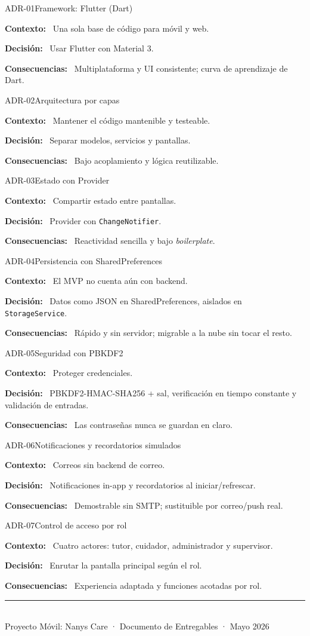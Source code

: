 \documentclass[11pt,a4paper]{article}
\newcommand{\adrcampo}[1]{\par\smallskip\textbf{\color{guindaDark}#1:}\ }
\begin{document}
\begin{adr}{ADR-01}{Framework: Flutter (Dart)}
\adrcampo{Contexto} Una sola base de código para móvil y web.
\adrcampo{Decisión} Usar Flutter con Material 3.
\adrcampo{Consecuencias} Multiplataforma y UI consistente; curva de aprendizaje de Dart.
\end{adr}
\begin{adr}{ADR-02}{Arquitectura por capas}
\adrcampo{Contexto} Mantener el código mantenible y testeable.
\adrcampo{Decisión} Separar modelos, servicios y pantallas.
\adrcampo{Consecuencias} Bajo acoplamiento y lógica reutilizable.
\end{adr}
\begin{adr}{ADR-03}{Estado con Provider}
\adrcampo{Contexto} Compartir estado entre pantallas.
\adrcampo{Decisión} Provider con \texttt{ChangeNotifier}.
\adrcampo{Consecuencias} Reactividad sencilla y bajo \emph{boilerplate}.
\end{adr}
\begin{adr}{ADR-04}{Persistencia con SharedPreferences}
\adrcampo{Contexto} El MVP no cuenta aún con backend.
\adrcampo{Decisión} Datos como JSON en SharedPreferences, aislados en \texttt{StorageService}.
\adrcampo{Consecuencias} Rápido y sin servidor; migrable a la nube sin tocar el resto.
\end{adr}
\begin{adr}{ADR-05}{Seguridad con PBKDF2}
\adrcampo{Contexto} Proteger credenciales.
\adrcampo{Decisión} PBKDF2-HMAC-SHA256 + sal, verificación en tiempo constante y validación de entradas.
\adrcampo{Consecuencias} Las contraseñas nunca se guardan en claro.
\end{adr}
\begin{adr}{ADR-06}{Notificaciones y recordatorios simulados}
\adrcampo{Contexto} Correos sin backend de correo.
\adrcampo{Decisión} Notificaciones in-app y recordatorios al iniciar/refrescar.
\adrcampo{Consecuencias} Demostrable sin SMTP; sustituible por correo/push real.
\end{adr}
\begin{adr}{ADR-07}{Control de acceso por rol}
\adrcampo{Contexto} Cuatro actores: tutor, cuidador, administrador y supervisor.
\adrcampo{Decisión} Enrutar la pantalla principal según el rol.
\adrcampo{Consecuencias} Experiencia adaptada y funciones acotadas por rol.
\end{adr}

\vfill
\begin{center}
{\color{guinda}\rule{0.35\linewidth}{0.6pt}}\\[4pt]
{\footnotesize\color{inkSoft} Proyecto Móvil: Nanys Care · Documento de Entregables · Mayo 2026}
\end{center}
\end{document}
